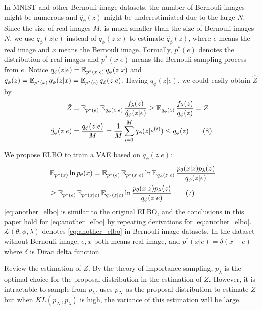 In MNIST and other Bernouli image datasets, the number of Bernouli images might be numerous and $\hat{q}_\phi(z)$ might be underestimiated due to the large $N$. 
Since the size of real images $M$, is much smaller than the size of Bernouli images $N$, we use $q_\phi(z|e)$ instead of $q_\phi(z|x)$ to estimate $\hat{q}_\phi(z)$, where $e$ means the real image and $x$ means the Bernouli image. 
Formally, $p^*(e)$ denotes the distribution of real images and $p^*(x|e)$ means the Bernouli sampling process from $e$. Notice $q_\phi(z|e) = \operatorname{\mathbb{E}}_{p^*(x|e)} q_\phi(z|x)$ and $q_\phi(z) = \operatorname{\mathbb{E}}_{p^*(x)} q_\phi(z|x) = \operatorname{\mathbb{E}}_{p^*(e)} q_\phi(z|e)$. 
Having $q_\phi(z|e)$, we could easily obtain $\hat{Z}$ by 
\begin{align*}~\label{eq:another_Z_estimator}
	\hat{Z} &= \operatorname{\mathbb{E}}_{p^*(e)} \operatorname{\mathbb{E}}_{q_\phi(z|e)} \frac{f_\lambda(z)}{\hat{q}_\phi(z|e)} \geq \operatorname{\mathbb{E}}_{q_\phi(z)} \frac{f_\lambda(z)}{q_\phi(z)} = Z \\
	\hat{q}_\phi(z|e) &= \frac{q_\phi(z|e)}{M} = \frac{1}{M}\sum_{i=1}^M q_\phi(z|e^{(i)}) \leq q_\phi(z) \tag{8}
\end{align*}  

We propose ELBO to train a VAE based on $q_\phi(z|e)$:
\begin{align*}~\label{eq:another_elbo}
	&\E_{p^*(x)} \ln p_\theta(x) = \E_{p^*(e)} \E_{p^*(x|e)} \ln \E_{q_\phi(z|e)} \frac{p_\theta(x|z)p_\lambda(z)}{q_\phi(z|e)} \\
	 &\geq \E_{p^*(e)} \E_{p^*(x|e)} \E_{q_\phi(z|e)} \ln \frac{p_\theta(x|z)p_\lambda(z)}{q_\phi(z|e)} \tag{7} %
\end{align*} 
\cref{eq:another_elbo} is similar to the original ELBO, and the conclusions in this paper hold for \cref{eq:another_elbo} by repeating derivations for \cref{eq:another_elbo}. $\mathcal{L}(\theta, \phi, \lambda)$ denotes \cref{eq:another_elbo} in Bernouli image datasets.  %
In the dataset without Bernouli image, $e, x$ both means real image, and $p^*(x|e) = \delta(x - e)$ where $\delta$ is Dirac delta function. 

Review the estimation of $Z$. By the theory of importance sampling, $p_\lambda$ is the optimal choice for the proposal distribution in the estimation of $Z$. However, it is intractable to sample from $p_\lambda$. 
\cite{bauer2019resampled} uses $p_\mathcal{N}$ as the proposal distribution to estimate $Z$ but when $KL(p_\mathcal{N}, p_\lambda)$ is high, the variance of this estimation will be large. 

